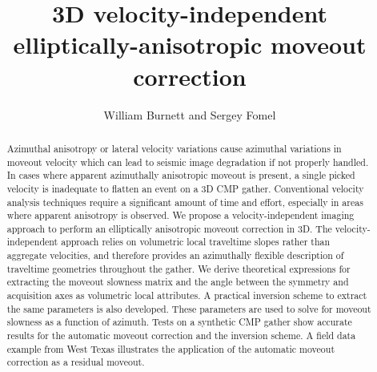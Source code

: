 \title{3D velocity-independent elliptically-anisotropic moveout correction}


\author{William Burnett and Sergey Fomel}


\address{Bureau of Economic Geology \\
John A. and Katherine G. Jackson School of Geosciences \\
The University of Texas at Austin \\
University Station, Box X \\
Austin, TX 78713-8924}


\maketitle

\begin{abstract}

Azimuthal anisotropy or lateral velocity variations cause azimuthal variations in moveout velocity which can lead to seismic image degradation if not properly handled.  In cases where apparent azimuthally anisotropic moveout is present, a single picked velocity is inadequate to flatten an event on a 3D CMP gather.  Conventional velocity analysis techniques require a significant amount of time and effort, especially in areas where apparent anisotropy is observed.  We propose a velocity-independent imaging approach to perform an elliptically anisotropic moveout correction in 3D.  The velocity-independent approach relies on volumetric local traveltime slopes rather than aggregate velocities, and therefore provides an azimuthally flexible description of traveltime geometries throughout the gather.  We derive theoretical expressions for extracting the moveout slowness matrix and the angle between the symmetry and acquisition axes as volumetric local attributes.  A practical inversion scheme to extract the same parameters is also developed.  These parameters are used to solve for moveout slowness as a function of azimuth.  Tests on a synthetic CMP gather show accurate results for the automatic moveout correction and the inversion scheme.  A field data example from West Texas illustrates the application of the automatic moveout correction as a residual moveout.

\end{abstract}

